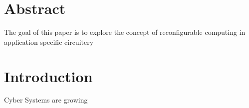 \chapter{Abstract}
The goal of this paper is to explore the concept of reconfigurable computing in application specific circuitery 
\chapter{Introduction}

Cyber Systems are growing 
